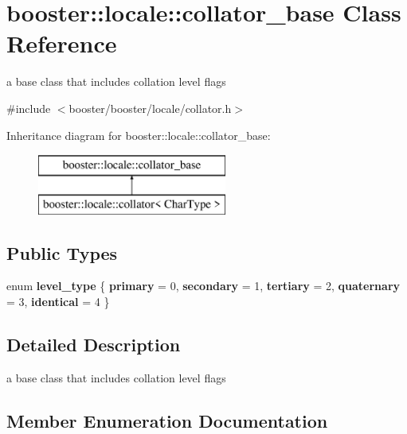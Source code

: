 \section{booster\-:\-:locale\-:\-:collator\-\_\-base \-Class \-Reference}
\label{classbooster_1_1locale_1_1collator__base}


a base class that includes collation level flags  




{\ttfamily \#include $<$booster/booster/locale/collator.\-h$>$}

\-Inheritance diagram for booster\-:\-:locale\-:\-:collator\-\_\-base\-:\begin{figure}[H]
\begin{center}
\leavevmode
\includegraphics[height=2.000000cm]{classbooster_1_1locale_1_1collator__base}
\end{center}
\end{figure}
\subsection*{\-Public \-Types}
\begin{DoxyCompactItemize}
\item 
enum {\bf level\-\_\-type} \{ \*
{\bf primary} =  0, 
{\bf secondary} =  1, 
{\bf tertiary} =  2, 
{\bf quaternary} =  3, 
\*
{\bf identical} =  4
 \}
\end{DoxyCompactItemize}


\subsection{\-Detailed \-Description}
a base class that includes collation level flags 

\subsection{\-Member \-Enumeration \-Documentation}
